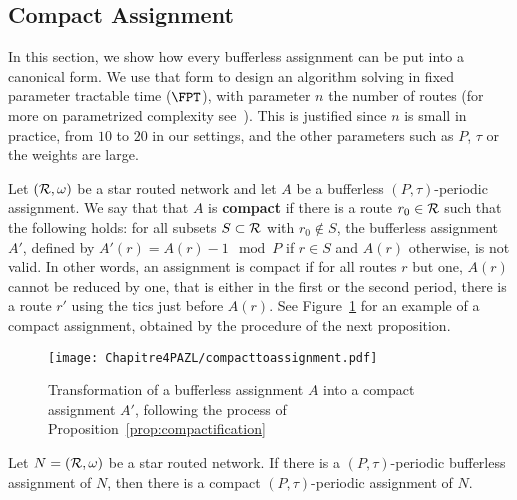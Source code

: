 \subsection{Compact Assignment}

In this section, we show how every bufferless assignment can be put into a canonical form.
We use that form to design an algorithm solving \pazl in fixed parameter tractable time ($\FPT$), with parameter $n$ the number of routes (for more on parametrized complexity see~\cite{downey2012parameterized}). This is justified since $n$ is small in practice, from $10$ to $20$ in our settings, and the other parameters such as $P$, $\tau$ or the weights are large.

Let $({\cal R},\omega)$ be a star routed network and let $A$ be a bufferless $(P,\tau)$-periodic assignment.
We say that that $A$ is \textbf{compact} if there is a route $r_0 \in \cal{R}$ such that the following holds: for all subsets $S\subset \cal{R}$ with $r_0 \notin S$, the bufferless assignment $A'$, defined by $A'(r) = A(r) - 1 \mod P$ if $r \in S$ and $A(r)$ otherwise, is not valid. In other words, an assignment is compact if for all routes $r$ but one, $A(r)$ cannot be reduced by one, that is either in the first or the second period, there is a route $r'$ using the tics just before $A(r)$. See Figure~\ref{fig:compact} for an example of a compact assignment, obtained by the procedure of the next proposition. 
  \begin{figure}
      \begin{center} 
      \texttt{[image: Chapitre4PAZL/compacttoassignment.pdf]}
      \end{center}
      \caption{Transformation of a bufferless assignment $A$ into a compact assignment $A'$, following the process of Proposition~\ref{prop:compactification}}
      \label{fig:compact}
      \end{figure}
\begin{proposition}\label{prop:compactification}
Let $N = ({\cal R}, \omega)$ be a star routed network. If there is a $(P,\tau)$-periodic bufferless assignment of $N$, then there is a compact $(P,\tau)$-periodic assignment of $N$.
\end{proposition}
